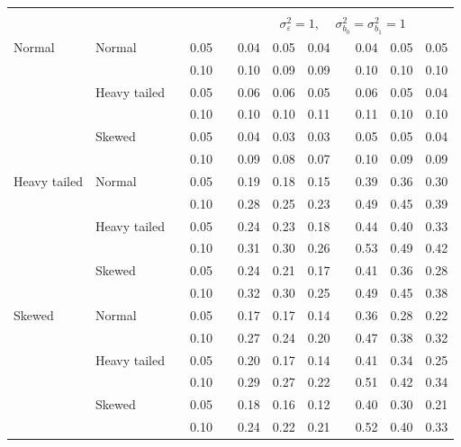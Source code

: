\documentclass[12pt]{article} %
\begin{document}
\begin{table}[ht]
\begin{scriptsize}
\begin{center}
\begin{tabular}{ll p{.1cm} c p{.1cm} rrr p{.1cm} rrr}
&&&&&&&&&&&\\
& && && \multicolumn{7}{c}{$\sigma_{\varepsilon}^2 = 1$, \ \ $\sigma_{b_0}^2 = \sigma_{b_1}^2 = 1$} \\ \cline{6-12}
Normal       & Normal       && 0.05 &&   0.04 & 0.05 & 0.04 && 0.04 & 0.05 & 0.05 \\ 
             &              && 0.10 &&   0.10 & 0.09 & 0.09 && 0.10 & 0.10 & 0.10 \\ 
             & Heavy tailed && 0.05 &&   0.06 & 0.06 & 0.05 && 0.06 & 0.05 & 0.04 \\ 
             &              && 0.10 &&   0.10 & 0.10 & 0.11 && 0.11 & 0.10 & 0.10 \\ 
             & Skewed       && 0.05 &&   0.04 & 0.03 & 0.03 && 0.05 & 0.05 & 0.04 \\ 
             &              && 0.10 &&   0.09 & 0.08 & 0.07 && 0.10 & 0.09 & 0.09 \\ 
Heavy tailed & Normal       && 0.05 &&   0.19 & 0.18 & 0.15 && 0.39 & 0.36 & 0.30 \\ 
             &              && 0.10 &&   0.28 & 0.25 & 0.23 && 0.49 & 0.45 & 0.39 \\ 
             & Heavy tailed && 0.05 &&   0.24 & 0.23 & 0.18 && 0.44 & 0.40 & 0.33 \\ 
             &              && 0.10 &&   0.31 & 0.30 & 0.26 && 0.53 & 0.49 & 0.42 \\ 
             & Skewed       && 0.05 &&   0.24 & 0.21 & 0.17 && 0.41 & 0.36 & 0.28 \\ 
             &              && 0.10 &&   0.32 & 0.30 & 0.25 && 0.49 & 0.45 & 0.38 \\ 
Skewed       & Normal       && 0.05 &&   0.17 & 0.17 & 0.14 && 0.36 & 0.28 & 0.22 \\ 
             &              && 0.10 &&   0.27 & 0.24 & 0.20 && 0.47 & 0.38 & 0.32 \\ 
             & Heavy tailed && 0.05 &&   0.20 & 0.17 & 0.14 && 0.41 & 0.34 & 0.25 \\ 
             &              && 0.10 &&   0.29 & 0.27 & 0.22 && 0.51 & 0.42 & 0.34 \\ 
             & Skewed       && 0.05 &&   0.18 & 0.16 & 0.12 && 0.40 & 0.30 & 0.21 \\ 
             &              && 0.10 &&   0.24 & 0.22 & 0.21 && 0.52 & 0.40 & 0.33 \\ 



\end{tabular}
\end{center}
\end{scriptsize}
\end{table}
\end{document}
